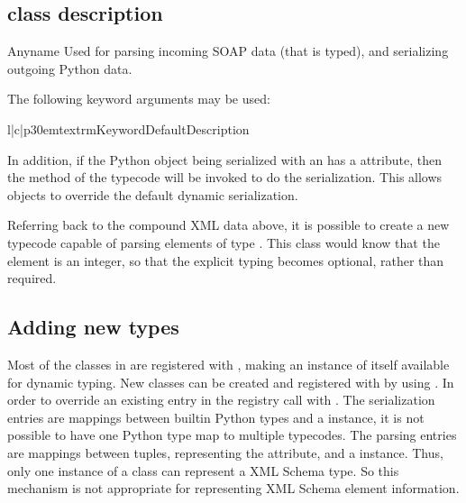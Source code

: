 \subsection{class description}
\begin{classdesc}{Any}{name}
Used for parsing incoming SOAP data (that is typed), and serializing
outgoing Python data.

The following keyword arguments may be used:

\begin{tableiii}{l|c|p{30em}}{textrm}{Keyword}{Default}{Description}
\end{tableiii}

In addition, if the Python object being serialized with an 
has a  attribute, then the  method of
the typecode will be invoked to do the serialization.
This allows objects to override the default dynamic serialization.
\end{classdesc}

Referring back to the compound XML data above, it is possible to create a new
typecode capable of parsing elements of type .
This class would know that the  element is an integer,
so that the explicit typing becomes optional, rather than required.

\subsection{Adding new types} Most of the  classes in
 are registered with , making an instance of itself
available for dynamic typing.  New  classes can be created and
registered with  by using .  In order to
override an existing entry in the registry call  with
.  The serialization entries are mappings between builtin
Python types and a  instance, it is not possible to have one
Python type map to multiple typecodes.  The parsing entries are mappings
between   tuples, representing the 
attribute, and a  instance.  Thus, only one instance of a 
 class can represent a XML Schema type.  So this mechanism is
not appropriate for representing XML Schema element information.

